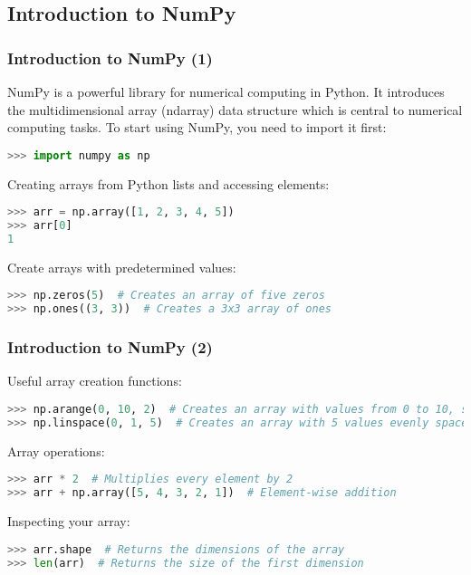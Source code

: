 \subsection*{Introduction to NumPy}
\begin{frame}[fragile]
  \frametitle{Introduction to NumPy (1)}
  NumPy is a powerful library for numerical computing in Python. It introduces the multidimensional array (ndarray) data structure which is central to numerical computing tasks. To start using NumPy, you need to import it first:
  \begin{lstlisting}[language=Python, numbers=none]
>>> import numpy as np
  \end{lstlisting}\pause
  Creating arrays from Python lists and accessing elements:
  \begin{lstlisting}[language=Python, numbers=none]
>>> arr = np.array([1, 2, 3, 4, 5])
>>> arr[0]
1
  \end{lstlisting}\pause
  Create arrays with predetermined values:
  \begin{lstlisting}[language=Python, numbers=none]
>>> np.zeros(5)  # Creates an array of five zeros
>>> np.ones((3, 3))  # Creates a 3x3 array of ones
  \end{lstlisting}
\end{frame}

\begin{frame}[fragile]
  \frametitle{Introduction to NumPy (2)}
  Useful array creation functions:
  \begin{lstlisting}[language=Python, numbers=none]
>>> np.arange(0, 10, 2)  # Creates an array with values from 0 to 10, step 2
>>> np.linspace(0, 1, 5)  # Creates an array with 5 values evenly spaced between 0 and 1
  \end{lstlisting}\pause
  Array operations:
  \begin{lstlisting}[language=Python, numbers=none]
>>> arr * 2  # Multiplies every element by 2
>>> arr + np.array([5, 4, 3, 2, 1])  # Element-wise addition
  \end{lstlisting}\pause
  Inspecting your array:
  \begin{lstlisting}[language=Python, numbers=none]
>>> arr.shape  # Returns the dimensions of the array
>>> len(arr)  # Returns the size of the first dimension
  \end{lstlisting}
\end{frame}

